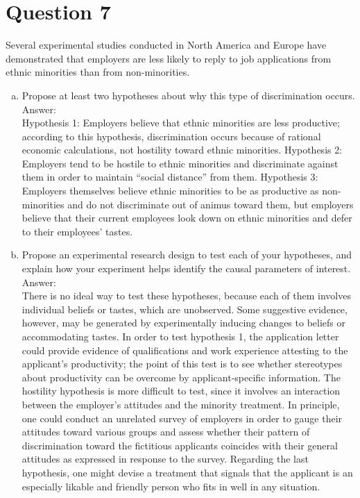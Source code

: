 \documentclass[11pt,notitlepage]{article}\usepackage[]{graphicx}\usepackage[]{color}
\begin{document}
\section*{Question 7}
Several experimental studies conducted in North America and Europe have demonstrated that employers are less likely to reply to job applications from ethnic minorities than from non-minorities.

\begin{enumerate}[a)]
\item Propose at least two hypotheses about why this type of discrimination occurs. \\
Answer:\\
Hypothesis 1: Employers believe that ethnic minorities are less productive; according to this hypothesis, discrimination occurs because of rational economic calculations, not hostility toward ethnic minorities. Hypothesis 2: Employers tend to be hostile to ethnic minorities and discriminate against them in order to maintain ``social distance'' from them.  Hypothesis 3: Employers themselves believe ethnic minorities to be as productive as non-minorities and do not discriminate out of animus toward them, but employers believe that their current employees look down on ethnic minorities and defer to their employees' tastes.

\item Propose an experimental research design to test each of your hypotheses, and explain how your experiment helps identify the causal parameters of interest.\\
Answer:\\
There is no ideal way to test these hypotheses, because each of them involves individual beliefs or tastes, which are unobserved. Some suggestive evidence, however, may be generated by experimentally inducing changes to beliefs or accommodating tastes. In order to test hypothesis 1, the application letter could provide evidence of qualifications and work experience attesting to the applicant's productivity; the point of this test is to see whether stereotypes about productivity can be overcome by applicant-specific information. The hostility hypothesis is more difficult to test, since it involves an interaction between the employer's attitudes and the minority treatment. In principle, one could conduct an unrelated survey of employers in order to gauge their attitudes toward various groups and assess whether their pattern of discrimination toward the fictitious applicants coincides with their general attitudes as expressed in response to the survey. Regarding the last hypothesis, one might devise a treatment that signals that the applicant is an especially likable and friendly person who fits in well in any situation.  



\end{enumerate}
\end{document}

